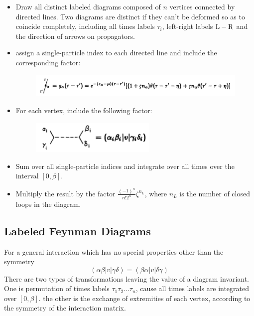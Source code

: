 \documentclass[12pt]{article}
\begin{document}
\begin{itemize}
    \item Draw all distinct labeled diagrams composed of $n$ vertices connected 
    by directed lines. Two diagrams are distinct if they can't be deformed so as 
    to coincide completely, including all times labels $\tau_i$, left-right 
    labels $\rm L-R$ and the direction of arrows on propagators.
    \item assign a single-particle index to each directed line and include the 
    corresponding factor:
    \begin{figure}[H]
        \centering
        \includegraphics[width=15cm]{p3.png}
        \caption*{}
        \label{}
    \end{figure} 
    \item For each vertex, include the following factor:
    \begin{figure}[H]
        \centering
        \includegraphics[width=6cm]{p1.png}
        \caption*{}
        \label{}
    \end{figure}
    \item Sum over all single-particle indices and integrate over all times over 
    the interval $[0,\beta]$.
    \item Multiply the result by the factor $\frac{(-1)^n}{n!2^n}\zeta^{n_L}$, 
    where $n_L$ is the number of closed loops in the diagram.
\end{itemize}
\subsection*{Labeled Feynman Diagrams} 
For a general interaction which has no special properties other than the symmetry
\begin{equation*}
    (\alpha\beta|v|\gamma\delta)=(\beta\alpha|v|\delta\gamma)
\end{equation*}
There are two types of transformations leaving the value of a diagram invariant. 
One is permutation of times labels $\tau_1\tau_2\dots\tau_n$, cause all times labels 
are integrated over $[0,\beta]$. the other is the exchange of extremities of each 
vertex, according to the symmetry of the interaction matrix.
\end{document}
